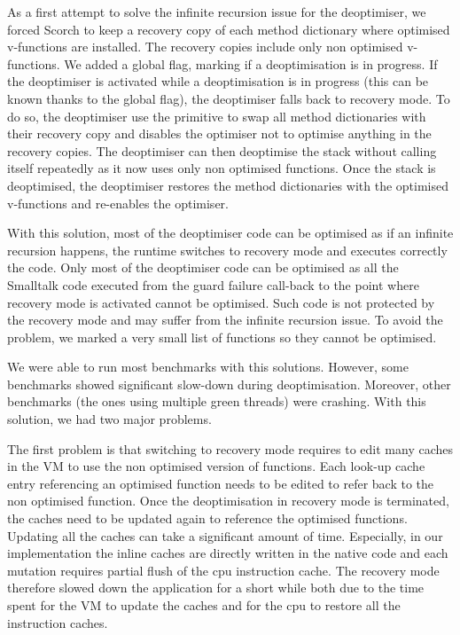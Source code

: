 \documentclass[a4paper,12pt,twoside]{../includes/ThesisStyle}
\begin{document}
As a first attempt to solve the infinite recursion issue for the deoptimiser, we forced Scorch to keep a recovery copy of each method dictionary where optimised v-functions are installed. The recovery copies include only non optimised v-functions. We added a global flag, marking if a deoptimisation is in progress. If the deoptimiser is activated while a deoptimisation is in progress (this can be known thanks to the global flag), the deoptimiser falls back to recovery mode. To do so, the deoptimiser use the primitive  to swap all method dictionaries with their recovery copy and disables the optimiser not to optimise anything in the recovery copies. The deoptimiser can then deoptimise the stack without calling itself repeatedly as it now uses only non optimised functions. Once the stack is deoptimised, the deoptimiser restores the method dictionaries with the optimised v-functions and re-enables the optimiser. 

With this solution, most of the deoptimiser code can be optimised as if an infinite recursion happens, the runtime switches to recovery mode and executes correctly the code. Only most of the deoptimiser code can be optimised as all the Smalltalk code executed from the guard failure call-back to the point where recovery mode is activated cannot be optimised. Such code is not protected by the recovery mode and may suffer from the infinite recursion issue. To avoid the problem, we marked a very small list of functions so they cannot be optimised.

We were able to run most benchmarks with this solutions. However, some benchmarks showed significant slow-down during deoptimisation. Moreover, other benchmarks (the ones using multiple green threads) were crashing. With this solution, we had two major problems. 

The first problem is that switching to recovery mode requires to edit many caches in the VM to use the non optimised version of functions. Each look-up cache entry referencing an optimised function needs to be edited to refer back to the non optimised function. Once the deoptimisation in recovery mode is terminated, the caches need to be updated again to reference the optimised functions. Updating all the caches can take a significant amount of time. Especially, in our implementation the inline caches are directly written in the native code and each mutation requires partial flush of the cpu instruction cache. The recovery mode therefore slowed down the application for a short while both due to the time spent for the VM to update the caches and for the cpu to restore all the instruction caches.
\end{document}
